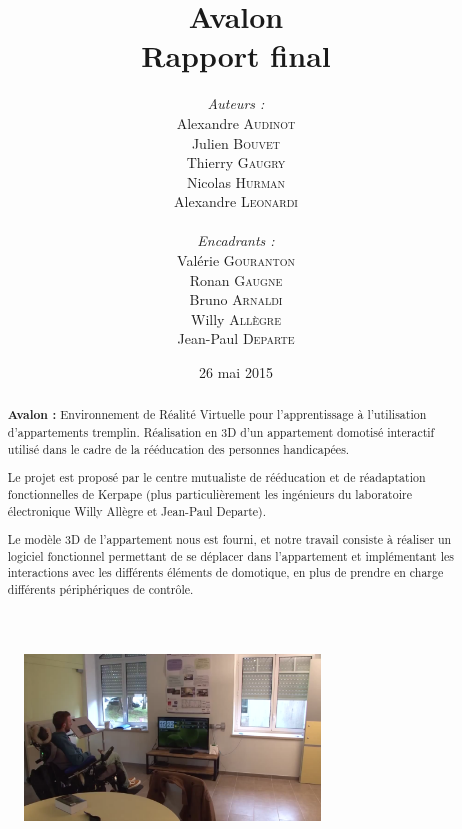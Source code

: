 \documentclass[a4paper,11pt]{article}
\title{
  \textbf{Avalon}\\
  Rapport final
}
\author{
\begin{minipage}{0.4\textwidth}
	\begin{flushleft} \large
		\emph{Auteurs :}\\
		Alexandre \textsc{Audinot}\\
		Julien \textsc{Bouvet}\\
		Thierry \textsc{Gaugry}\\
		Nicolas \textsc{Hurman}\\
		Alexandre \textsc{Leonardi}\\
	\end{flushleft}
\end{minipage}
\begin{minipage}{0.4\textwidth}
	\begin{flushright} \large
		\emph{Encadrants :} \\
		Valérie \textsc{Gouranton}\\
		Ronan \textsc{Gaugne}\\
		Bruno \textsc{Arnaldi}\\
		Willy \textsc{Allègre}\\
		Jean-Paul  \textsc{Departe}\\
	\end{flushright}
\end{minipage}
}
\date{26 mai 2015}
\begin{document}
\maketitle
\thispagestyle{empty}
\begin{abstract}
\textbf{Avalon :} Environnement de Réalité Virtuelle pour l'apprentissage à l'utilisation d'appartements tremplin. Réalisation en 3D d'un appartement domotisé interactif utilisé dans le cadre de la rééducation des personnes handicapées.\newline

Le projet est proposé par le centre mutualiste de rééducation et de réadaptation fonctionnelles de Kerpape (plus particulièrement les ingénieurs du laboratoire électronique Willy Allègre et Jean-Paul Departe).\newline

Le modèle 3D de l'appartement nous est fourni, et notre travail consiste à réaliser un logiciel fonctionnel permettant de se déplacer dans l'appartement et implémentant les interactions avec les différents éléments de domotique, en plus de prendre en charge différents périphériques de contrôle. 
\end{abstract}

\begin{figure}[h!]
	\centering
	\includegraphics[width=0.7\textwidth]{7-RapportFinal/img/screen_appart.png}
\end{figure}
\end{document}
